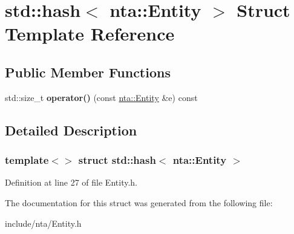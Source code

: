 \hypertarget{structstd_1_1hash_3_01nta_1_1Entity_01_4}{}\section{std\+:\+:hash$<$ nta\+:\+:Entity $>$ Struct Template Reference}
\label{structstd_1_1hash_3_01nta_1_1Entity_01_4}
\subsection*{Public Member Functions}
\begin{DoxyCompactItemize}
\item 
\mbox{\label{structstd_1_1hash_3_01nta_1_1Entity_01_4_a0db14df5d7ed3ebab2d6788c3430efec}} 
std\+::size\+\_\+t {\bfseries operator()} (const \hyperlink{classnta_1_1Entity}{nta\+::\+Entity} \&e) const
\end{DoxyCompactItemize}


\subsection{Detailed Description}
\subsubsection*{template$<$$>$\newline
struct std\+::hash$<$ nta\+::\+Entity $>$}



Definition at line 27 of file Entity.\+h.



The documentation for this struct was generated from the following file\+:\begin{DoxyCompactItemize}
\item 
include/nta/Entity.\+h\end{DoxyCompactItemize}
